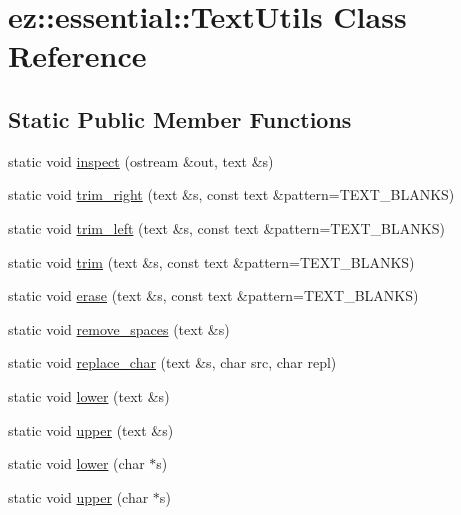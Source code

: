 \hypertarget{classez_1_1essential_1_1TextUtils}{}\section{ez\+:\+:essential\+:\+:Text\+Utils Class Reference}
\label{classez_1_1essential_1_1TextUtils}
\subsection*{Static Public Member Functions}
\begin{DoxyCompactItemize}
\item 
static void \hyperlink{classez_1_1essential_1_1TextUtils_ac863bdaba8e320a59e9fd9b7e58e802d}{inspect} (ostream \&out, text \&s)
\item 
static void \hyperlink{classez_1_1essential_1_1TextUtils_ad9570b43b0b7b3bcbd3e385beb36b7fb}{trim\+\_\+right} (text \&s, const text \&pattern=T\+E\+X\+T\+\_\+\+B\+L\+A\+N\+KS)
\item 
static void \hyperlink{classez_1_1essential_1_1TextUtils_a5c5473723c73d5df9c57712a29b5b7d2}{trim\+\_\+left} (text \&s, const text \&pattern=T\+E\+X\+T\+\_\+\+B\+L\+A\+N\+KS)
\item 
static void \hyperlink{classez_1_1essential_1_1TextUtils_a8050a5348d530a5e68470b68f7779d0a}{trim} (text \&s, const text \&pattern=T\+E\+X\+T\+\_\+\+B\+L\+A\+N\+KS)
\item 
static void \hyperlink{classez_1_1essential_1_1TextUtils_a20a364789ee8477561dd88a08abc7489}{erase} (text \&s, const text \&pattern=T\+E\+X\+T\+\_\+\+B\+L\+A\+N\+KS)
\item 
static void \hyperlink{classez_1_1essential_1_1TextUtils_a3058d2e043d835d9f4325b7f57ee9ed7}{remove\+\_\+spaces} (text \&s)
\item 
static void \hyperlink{classez_1_1essential_1_1TextUtils_ac2bffa195205d8bf85d718ef399292ed}{replace\+\_\+char} (text \&s, char src, char repl)
\item 
static void \hyperlink{classez_1_1essential_1_1TextUtils_a09ae87eaf31c8c0be44f616b560b9ebb}{lower} (text \&s)
\item 
static void \hyperlink{classez_1_1essential_1_1TextUtils_a921ab014e15e604a3a768f4840b991c0}{upper} (text \&s)
\item 
static void \hyperlink{classez_1_1essential_1_1TextUtils_ab751dfb12e15915bfc23039587f11cd6}{lower} (char $\ast$s)
\item 
static void \hyperlink{classez_1_1essential_1_1TextUtils_acdc8e1ff8d29b4ae7d62c5c4263a64b4}{upper} (char $\ast$s)

\end{DoxyCompactItemize}
